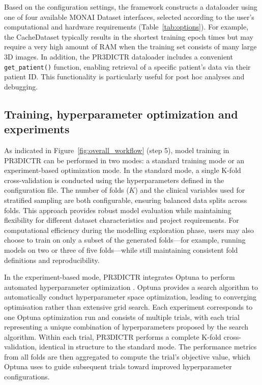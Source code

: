 \documentclass[11pt]{article}
\begin{document}
Based on the configuration settings, the framework constructs a dataloader using one of four available MONAI Dataset interfaces, selected according to the user's computational and hardware requirements (Table~\ref{tab:options}). For example, the CacheDataset typically results in the shortest training epoch times but may require a very high amount of RAM when the training set consists of many large 3D images. In addition, the PR3DICTR dataloader includes a convenient \texttt{get\_patient()} function, enabling retrieval of a specific patient's data via their patient ID. This functionality is particularly useful for post hoc analyses and debugging.

\subsection{Training, hyperparameter optimization and experiments}

As indicated in Figure~\ref{fig:overall_workflow} (step 5), model training in PR3DICTR can be performed in two modes: a standard training mode or an experiment-based optimization mode. In the standard mode, a single K-fold cross-validation is conducted using the hyperparameters defined in the configuration file. The number of folds ($K$) and the clinical variables used for stratified sampling are both configurable, ensuring balanced data splits across folds. This approach provides robust model evaluation while maintaining flexibility for different dataset characteristics and project requirements. For computational efficiency during the modelling exploration phase, users may also choose to train on only a subset of the generated folds---for example, running models on two or three of five folds---while still maintaining consistent fold definitions and reproducibility.

In the experiment-based mode, PR3DICTR integrates Optuna to perform automated hyperparameter optimization \cite{Akiba2019}. Optuna provides a search algorithm to automatically conduct hyperparameter space optimization, leading to converging optimisation rather than extensive grid search. Each experiment corresponds to one Optuna optimization run and consists of multiple trials, with each trial representing a unique combination of hyperparameters proposed by the search algorithm. Within each trial, PR3DICTR performs a complete K-fold cross-validation, identical in structure to the standard mode. The performance metrics from all folds are then aggregated to compute the trial's objective value, which Optuna uses to guide subsequent trials toward improved hyperparameter configurations.
\end{document}
